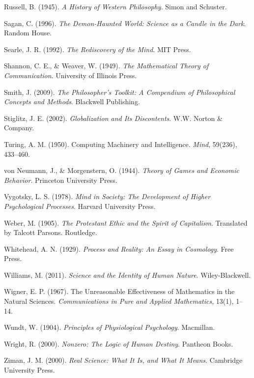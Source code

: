 \documentclass[twocolumn]{article}
\begin{document}
\begin{thebibliography}{99}
Russell, B. (1945). \textit{A History of Western Philosophy}. Simon and Schuster.

Sagan, C. (1996). \textit{The Demon-Haunted World: Science as a Candle in the Dark}. Random House.

Searle, J. R. (1992). \textit{The Rediscovery of the Mind}. MIT Press.

Shannon, C. E., \& Weaver, W. (1949). \textit{The Mathematical Theory of Communication}. University of Illinois Press.

Smith, J. (2009). \textit{The Philosopher’s Toolkit: A Compendium of Philosophical Concepts and Methods}. Blackwell Publishing.

Stiglitz, J. E. (2002). \textit{Globalization and Its Discontents}. W.W. Norton \& Company.

Turing, A. M. (1950). Computing Machinery and Intelligence. \textit{Mind}, 59(236), 433–460.

von Neumann, J., \& Morgenstern, O. (1944). \textit{Theory of Games and Economic Behavior}. Princeton University Press.

Vygotsky, L. S. (1978). \textit{Mind in Society: The Development of Higher Psychological Processes}. Harvard University Press.

Weber, M. (1905). \textit{The Protestant Ethic and the Spirit of Capitalism}. Translated by Talcott Parsons. Routledge.

Whitehead, A. N. (1929). \textit{Process and Reality: An Essay in Cosmology}. Free Press.

Williams, M. (2011). \textit{Science and the Identity of Human Nature}. Wiley-Blackwell.

Wigner, E. P. (1967). The Unreasonable Effectiveness of Mathematics in the Natural Sciences. \textit{Communications in Pure and Applied Mathematics}, 13(1), 1–14.

Wundt, W. (1904). \textit{Principles of Physiological Psychology}. Macmillan.

Wright, R. (2000). \textit{Nonzero: The Logic of Human Destiny}. Pantheon Books.

Ziman, J. M. (2000). \textit{Real Science: What It Is, and What It Means}. Cambridge University Press.

\end{thebibliography}
\end{document}
